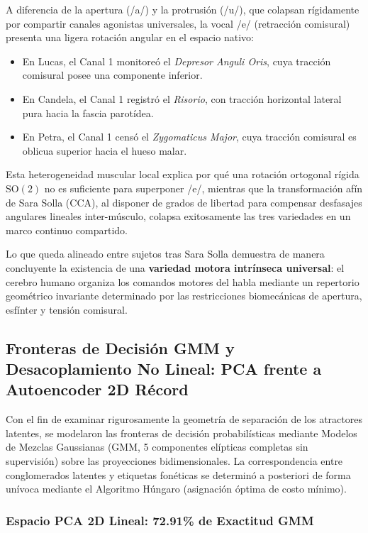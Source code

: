 \documentclass[11pt,a4paper,openany]{book}
\theoremstyle{definition}
\begin{document}
A diferencia de la apertura (/a/) y la protrusión (/u/), que colapsan rígidamente por compartir canales agonistas universales, la vocal /e/ (retracción comisural) presenta una ligera rotación angular en el espacio nativo:
\begin{itemize}
    \item En Lucas, el Canal 1 monitoreó el \textit{Depresor Anguli Oris}, cuya tracción comisural posee una componente inferior.
    \item En Candela, el Canal 1 registró el \textit{Risorio}, con tracción horizontal lateral pura hacia la fascia parotídea.
    \item En Petra, el Canal 1 censó el \textit{Zygomaticus Major}, cuya tracción comisural es oblicua superior hacia el hueso malar.
\end{itemize}

Esta heterogeneidad muscular local explica por qué una rotación ortogonal rígida $\text{SO}(2)$ no es suficiente para superponer /e/, mientras que la transformación afín de Sara Solla (CCA), al disponer de grados de libertad para compensar desfasajes angulares lineales inter-músculo, colapsa exitosamente las tres variedades en un marco continuo compartido.

Lo que queda alineado entre sujetos tras Sara Solla demuestra de manera concluyente la existencia de una \textbf{variedad motora intrínseca universal}: el cerebro humano organiza los comandos motores del habla mediante un repertorio geométrico invariante determinado por las restricciones biomecánicas de apertura, esfínter y tensión comisural.

\subsection{Fronteras de Decisión GMM y Desacoplamiento No Lineal: PCA frente a Autoencoder 2D Récord}
\label{subsec:fronteras_gmm_pca_vs_ae_sara_solla}

Con el fin de examinar rigurosamente la geometría de separación de los atractores latentes, se modelaron las fronteras de decisión probabilísticas mediante Modelos de Mezclas Gaussianas (GMM, 5 componentes elípticas completas sin supervisión) sobre las proyecciones bidimensionales. La correspondencia entre conglomerados latentes y etiquetas fonéticas se determinó a posteriori de forma unívoca mediante el Algoritmo Húngaro (asignación óptima de costo mínimo).

\subsubsection{Espacio PCA 2D Lineal: 72.91\% de Exactitud GMM}
\label{subsubsec:espacio_pca_2d_fronteras}
\end{document}
